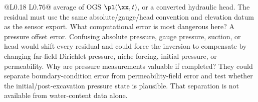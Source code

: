 \begin{longtable}{@{}L{0.18\textwidth} L{0.76\textwidth}@{}}
{average of OGS \(\pl(\xx,t)\), or a converted hydraulic head.  The residual must use
the same absolute/gauge/head convention and elevation datum as the sensor export.}
{ What computational error is most dangerous here?}
{A pressure offset error.  Confusing absolute pressure, gauge pressure, suction, or
head would shift every residual and could force the inversion to compensate by
changing far-field Dirichlet pressure, niche forcing, initial pressure, or
permeability.}
{ Why are pressure measurements valuable if completed?}
{They could separate boundary-condition error from permeability-field error and test
whether the initial/post-excavation pressure state is plausible.  That separation is
not available from water-content data alone.}
\bottomrule
\end{longtable}


